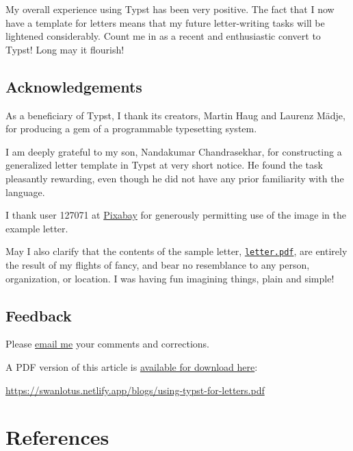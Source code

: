 \documentclass[
  a4paper,
]{article}
\begin{document}
My overall experience using Typst has been very positive. The fact that
I now have a template for letters means that my future letter-writing
tasks will be lightened considerably. Count me in as a recent and
enthusiastic convert to Typst! Long may it flourish!

\subsection{Acknowledgements}\label{acknowledgements}

As a beneficiary of Typst, I thank its creators, Martin Haug and Laurenz
Mädje, for producing a gem of a programmable typesetting system.

I am deeply grateful to my son, Nandakumar Chandrasekhar, for
constructing a generalized letter template in Typst at very short
notice. He found the task pleasantly rewarding, even though he did not
have any prior familiarity with the language.

I thank user 127071 at
\href{https://pixabay.com/photos/storm-damage-oak-tree-break-597217/}{Pixabay}
for generously permitting use of the image in the example letter.

May I also clarify that the contents of the sample letter,
\href{auxiliary/letter.pdf}{\texttt{letter.pdf}}, are entirely the
result of my flights of fancy, and bear no resemblance to any person,
organization, or location. I was having fun imagining things, plain and
simple!  \normalfont

\subsection{Feedback}\label{feedback}

Please \href{mailto:feedback.swanlotus@gmail.com}{email me} your
comments and corrections.

\noindent A PDF version of this article is
\href{./using-typst-for-letters.pdf}{available for download here}:

\begin{small}

\begin{sffamily}

\url{https://swanlotus.netlify.app/blogs/using-typst-for-letters.pdf}

\end{sffamily}

\end{small}

\section*{References}\label{bibliography}
\end{document}
